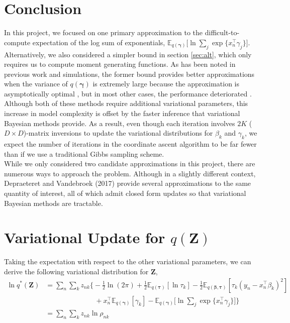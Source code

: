 \documentclass[twoside,11pt]{article}
\newcommand{\tr}{\intercal}
\newcommand{\boldgamma}{\boldsymbol\gamma}
\newcommand{\E}{\mathbb{E}}
\begin{document}
\section{Conclusion}
In this project, we focused on one primary approximation to the difficult-to-compute expectation of the log sum of exponentials, $\E_{q(\boldsymbol\gamma)}\big[\ln \sum_{j} \exp \{ x_n^{\tr} \gamma_j \} \big]$. 
Alternatively, we also considered a simpler bound in section \ref{sec:alt}, which only requires us to compute moment generating functions. As has been noted in previous work and simulations, the former bound provides better approximations when the variance of $q(\boldgamma)$ is extremely large because the approximation is asymptotically optimal \parencite{bouchard:07}, but in most other cases, the performance deteriorated \parencite{Depraetere:17}. Although both of these methods require additional variational parameters, this increase in model complexity is offset by the faster inference that variational Bayesian methods provide. As a result, even though each iteration involves $2K$ ($D \times D$)-matrix inversions to update the variational distributions for $\beta_k$ and $\gamma_k$, we expect the number of iterations in the coordinate ascent algorithm to be far fewer than if we use a traditional Gibbs sampling scheme. \\

While we only considered two candidate approximations in this project, there are numerous ways to approach the problem. Although in a slightly different context, Depraeteret and Vandebroek (2017) provide several approximations to the same quantity of interest, all of which admit closed form updates so that variational Bayesian methods are tractable. 




\newpage

\appendix
\section{Variational Update for $q(\mathbf{Z})$} 
\label{app:q_z}

Taking the expectation with respect to the other variational parameters, we can derive the following variational distribution for $\mathbf{Z}$,
\begin{align*}
	\ln q^{*}(\mathbf{Z}) &= \sum_n \sum_k z_{nk} \Bigg\{  -\frac{1}{2}\ln(2\pi) + \frac{1}{2} \E_{q(\boldsymbol\tau)}[ \ln \tau_k ] - \frac{1}{2} \E_{q(\boldsymbol\beta, \boldsymbol\tau)}[\tau_k (y_n - x_n^{\tr}\beta_k)^2] \\ 
	&\qquad \qquad \qquad \quad + x_n^{\tr}\E_{q(\boldsymbol\gamma)}[\gamma_k] - \E_{q(\boldsymbol\gamma)}\Bigg[\ln \sum_{j} \exp \{ x_n^{\tr} \gamma_j \}\Bigg]\Bigg\} \\
	&= \sum_n \sum_k z_{nk} \ln \rho_{nk}
\end{align*}
\end{document}
